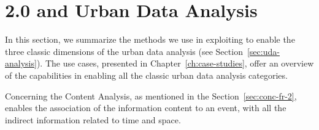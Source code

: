 \section{\frappe{} 2.0 and Urban Data Analysis} \label{sec:conc-fr-2-analysis}

In this section, we summarize the methods we use in exploiting \frappe{} to enable the three classic dimensions of the urban data analysis (see Section~\ref{sec:uda-analysis}).
The use cases, presented in Chapter~\ref{ch:case-studies}, offer an overview of the \frappe{} capabilities in enabling all the classic urban data analysis categories.

Concerning the Content Analysis, as mentioned in the Section~\ref{sec:conc-fr-2}, \frappe{} enables the association of the information content to an event, with all the indirect information related to time and space.


